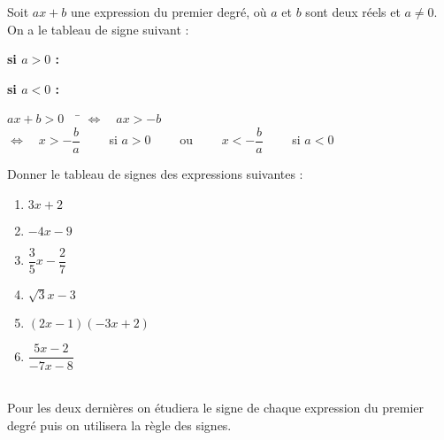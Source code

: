 \documentclass[a4paper,11pt,cours]{nsi}
\begin{document}
\begin{propriete}
	Soit $ax+b$ une expression du premier degré, où $a$ et $b$ sont deux réels et $a\neq 0$. On a le tableau de signe suivant :
	
	\textbf{\boldmath si $a>0$ :}
	\begin{center}
	\end{center}
	
	\textbf{\boldmath si $a<0$ :}
	\begin{center}
	\end{center}
\end{propriete}

\begin{demonstration}
			\begin{tabbing}
				$ax+b>0\quad$	\=	$\Leftrightarrow\quad ax>-b$\\
				\>	$\Leftrightarrow\quad x>-\dfrac{b}{a}\qquad$ si $a>0\qquad$ ou $\qquad x<-\dfrac{b}{a}\qquad$ si $a<0$
			\end{tabbing}
\end{demonstration}


\begin {exercice}
Donner le tableau de signes des expressions suivantes :
\begin{multicols}{2}
	\begin{enumerate}
		\item 	$3x+2$
		\item 	$-4x-9$
		\item 	$\dfrac{3}{5}x-\dfrac{2}{7}$
		\item 	$\sqrt{3}x-3$
		\item 	$(2x-1)(-3x+2)$
		\item	$\dfrac{5x-2}{-7x-8}$
	\end{enumerate}
\end{multicols}\ \\[-2em]
Pour les deux dernières on étudiera le signe de chaque expression du premier degré puis on utilisera la règle des signes.
\end {exercice}
\end{document}
